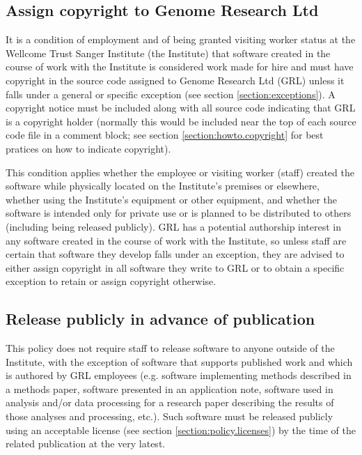 \documentclass[10pt,a4paper]{article}
\begin{document}
\subsection{Assign copyright to Genome Research Ltd}
\label{section:policy.copyright}
\par It is a condition of employment and of being granted visiting worker status at the 
Wellcome Trust Sanger Institute (the Institute) that software created in the course 
of work with the Institute is considered work made for hire and must have 
copyright in the source code assigned to Genome Research Ltd (GRL) unless it 
falls under a general or specific exception (see section \ref{section:exceptions}). 
A copyright notice must be included along with all source code indicating that 
GRL is a copyright holder (normally this would be included near the top of each 
source code file in a comment block; see section \ref{section:howto.copyright} for best 
pratices on how to indicate copyright). 

\par This condition applies whether the employee or visiting worker (staff) 
created the software while physically located on the Institute's premises or 
elsewhere, whether using the Institute's equipment or other equipment, and 
whether the software is intended only for private use or is planned to be 
distributed to others (including being released publicly). GRL has a potential 
authorship interest in any software created in the course of work with the 
Institute, so unless staff are certain that software they develop falls 
under an exception, they are advised to either assign copyright in all software 
they write to GRL or to obtain a specific exception to retain or assign copyright 
otherwise.



\subsection{Release publicly in advance of publication}

\par This policy does not require staff to release software to anyone outside of 
the Institute, with the exception of software that supports published work and which 
is authored by GRL employees (e.g. software implementing methods described 
in a methods paper, software presented in an application note, software used in 
analysis and/or data processing for a research paper describing the results of 
those analyses and processing, etc.). Such software must be released 
publicly using an acceptable license (see section \ref{section:policy.licenses}) 
by the time of the related publication at the very latest. 
\end{document}
